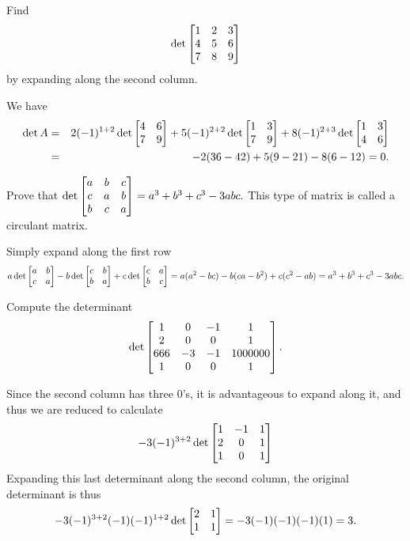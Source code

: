 \begin{pro}
Find $$\det\begin{bmatrix} 1 & 2 & 3 \cr 4 & 5 & 6 \cr  7 & 8 & 9
\cr
\end{bmatrix}$$by expanding along the second column.
\begin{answer} We have
\begin{eqnarray*}\det A  & = & 2(-1)^{1 + 2}\det
\begin{bmatrix} 4 & 6 \cr 7 & 9 \end{bmatrix} + 5(-1)^{2 + 2}\det
\begin{bmatrix} 1 & 3 \cr 7 & 9 \end{bmatrix} + 8(-1)^{2 + 3}\det
\begin{bmatrix} 1 & 3 \cr 4 & 6 \end{bmatrix} \\ &  =  & -2(36 - 42) +
5(9 - 21) - 8(6 - 12) = 0. \end{eqnarray*}
\end{answer}
\end{pro}
\begin{pro}
Prove that $\det \begin{bmatrix} a & b & c \cr c &a& b \cr b &c & a
\cr
\end{bmatrix} = a^3+b^3+c^3-3abc. $ This type of matrix is called a
{ circulant matrix}.
\begin{answer} Simply expand along the first row$$a\det\begin{bmatrix} a & b
\cr c & a
\end{bmatrix} - b\det\begin{bmatrix}
c & b \cr b & a
\end{bmatrix} + c\det\begin{bmatrix}
c & a \cr b & c\end{bmatrix} = a(a^2 -bc ) - b(ca - b^2) + c(c^2 -
ab) = a^3+b^3+c^3-3abc .
$$
\end{answer}

\end{pro}
\begin{pro}Compute the determinant
$$\det \begin{bmatrix}
     1 & 0 & -1 & 1 \cr
     2 & 0 & 0 & 1 \cr
     666 & -3  & -1 & 1000000 \cr
     1 & 0 & 0 &1 \cr
\end{bmatrix}.$$
\begin{answer} Since the second column has three $0$'s, it is advantageous
to expand along it, and thus we are reduced to calculate
$$-3(-1)^{3 + 2} \det \begin{bmatrix}
                1 & -1 & 1 \cr
                2 & 0 & 1 \cr
                1 & 0 & 1 \cr
\end{bmatrix}$$
Expanding this last determinant along the second column, the
original determinant is thus
$$-3(-1)^{3 + 2}(-1)(-1)^{1 + 2}\det \begin{bmatrix}
            2 & 1 \cr
            1 & 1 \cr
\end{bmatrix} = -3(-1)(-1)(-1)(1) = 3.$$
\end{answer}
\end{pro}
